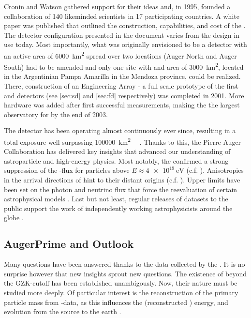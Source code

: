 Cronin and Watson gathered support for their ideas and, in 1995, founded a 
collaboration of 140 likeminded scientists in 17 participating countries. A 
white paper was published that outlined the construction, capabilities, and 
cost of the \PAO \cite{theaugercollaborationPierreAugerObservatory}. The 
detector configuration presented in the document varies from the design in use 
today. Most importantly, what was originally envisioned to be a detector with an
active area of \SI{6000}{\km\squared} spread over two locations (Auger North and
Auger South) had to be amended and only one site with and area of 
\SI{3000}{\km\squared}, located in the Argentinian Pampa Amarilla in the Mendoza
province, could be realized. There, construction of an Engineering Array - a 
full scale prototype of the first \SD and \FD detectors (see \cref{sec:sd} and 
\cref{sec:fd} respectively) was completed in 2001. More hardware was added after
first successful measurements, making the \PAO the largest observatory for \CRs 
by the end of 2003.

The detector has been operating almost continuously ever since, resulting in a 
total exposure well surpassing \SI{100000}{\km\squared\sr\year} 
\cite{aabPierreAugerObservatory2020}. Thanks to this, the Pierre Auger 
Collaboration has delivered key insights that advanced our understanding of 
astroparticle and high-energy physics. Most notably, the \PAO confirmed a 
strong suppression of the \CR-flux for particles above 
$E\approx\SI{4e19}{\eV}$ \cite{yamamotoUHECRSpectrumMeasured2007} (c.f. 
). Anisotropies in the arrival directions of \UHECRs 
hint to their distant origins
\cite{thepierreaugercollaborationObservationLargescaleAnisotropy2017} (c.f. 
). Upper limits have been set on the \UHE photon and
neutrino flux that force the reevaluation of certain astrophysical models 
\cite{collaborationPierreAugerObservatory2011, abreuSearchUltrahighEnergy2011}.
Last but not least, regular releases of datasets to the public support the work 
of independently working astrophysicists around the globe 
\cite{pierreaugercollaborationPierreAugerObservatory2025}.

\subsection{AugerPrime and Outlook}
\label{ssec:augerprime-and-outlook}

Many questions have been answered thanks to the data collected by the \PAO. It
is no surprise however that new insights sprout new questions. The existence of 
\UHECRs beyond the GZK-cutoff has been established unambigously. Now, their
nature must be studied more deeply. Of particular interest is the reconstruction
of the primary particle mass from \EAS-data, as this influences the \CRs
(reconstructed \cite{yushkovMassCompositionCosmic2021}) energy, and evolution 
from the source to the earth \cite{strongCosmicRayPropagationInteractions2007, 
flaggsStudyingMassSensitivity2024}.

